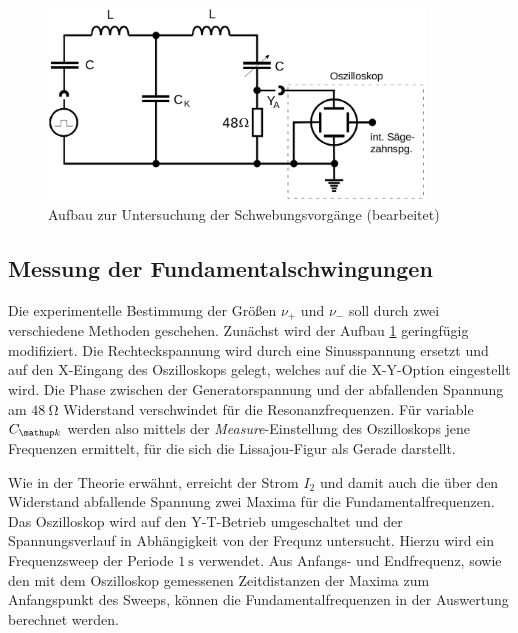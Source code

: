 \begin{figure}
  \centering
  \includegraphics[width = 10cm]{pics/aufbau_schwebung.png}
  \caption{Aufbau zur Untersuchung der Schwebungsvorgänge \cite{anleitung355} (bearbeitet)}
  \label{fig: schwebung}
\end{figure}

\subsection{Messung der Fundamentalschwingungen}
Die experimentelle Bestimmung der Größen $\nu_+$ und $\nu_-$ soll durch zwei verschiedene Methoden geschehen. Zunächst wird der Aufbau \ref{fig: schwebung}
geringfügig modifiziert. Die Rechteckspannung wird durch eine Sinusspannung ersetzt und auf den X-Eingang des Oszilloskops gelegt, welches auf die X-Y-Option
eingestellt wird. Die Phase zwischen der Generatorspannung und der abfallenden Spannung am $\SI{48}{\ohm}$ Widerstand verschwindet für die Resonanzfrequenzen.
Für variable $C\ua{k}$ werden also mittels der \emph{Measure}-Einstellung des Oszilloskops jene Frequenzen ermittelt, für die sich die Lissajou-Figur als Gerade darstellt.\par
Wie in der Theorie erwähnt, erreicht der Strom $I_2$ und damit auch die über den Widerstand abfallende Spannung zwei Maxima für die Fundamentalfrequenzen.
Das Oszilloskop wird auf den Y-T-Betrieb umgeschaltet und der Spannungsverlauf in Abhängigkeit von der Frequnz untersucht. Hierzu wird ein Frequenzsweep
der Periode $\SI{1}{\second}$ verwendet. Aus Anfangs- und Endfrequenz, sowie den mit dem Oszilloskop gemessenen Zeitdistanzen der Maxima zum Anfangspunkt
des Sweeps, können die Fundamentalfrequenzen in der Auswertung berechnet werden.
\newpage
